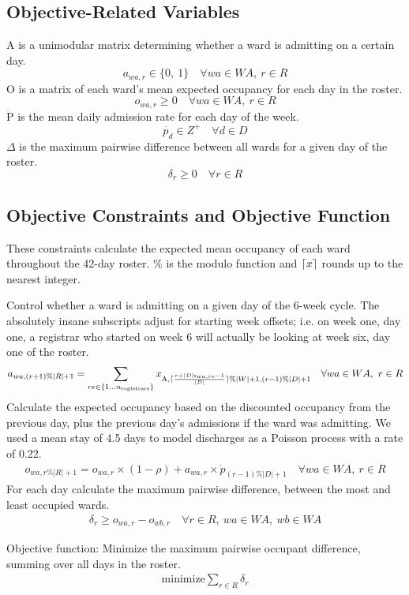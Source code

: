 \documentclass[a4paper]{article}
\DeclarePairedDelimiter{\ceil}{\lceil}{\rceil}
\begin{document}
\subsection{Objective-Related Variables}

A is a unimodular matrix determining whether a ward is admitting on a certain day.
$$a_{wa, r} \in \{0,\ 1\} \quad\forall wa\in WA,\ r\in R$$
O is a matrix of each ward's mean expected occupancy for each day in the roster.
$$o_{wa, r} \ge 0 \quad\forall wa\in WA,\ r\in R$$
$\dot{\text{P}}$ is the mean daily admission rate for each day of the week.
$$\dot{p_{d}} \in Z^+ \quad\forall d\in D$$
$\Delta$ is the maximum pairwise difference between all wards for a given day of the roster.
$$\delta_r \ge 0 \quad\forall r \in R$$

\subsection{Objective Constraints and Objective Function}

These constraints calculate the expected mean occupancy of each ward throughout the 42-day roster. $\%$ is the modulo function and $\ceil{x}$ rounds up to the nearest integer.

Control whether a ward is admitting on a given day of the 6-week cycle. The absolutely insane subscripts adjust for starting week offsets; i.e. on week one, day one, a registrar who started on week 6 will actually be looking at week six, day one of the roster.
\begin{align}
  a_{wa, (r+1)\%|R|+1} = \sum_{re\in \{1\dots n_\text{registrars}\}}{x_{\text{A}, \ceil{\frac{r+|D|\text{s}_{wa, re}-1}{|D|}} \% |W|+1, (r-1) \% |D|+1}} \quad\forall wa \in WA,\ r \in R
\end{align}
Calculate the expected occupancy based on the discounted occupancy from the previous day, plus the previous day's admissions if the ward was admitting. We used a mean stay of 4.5 days to model discharges as a Poisson process with a rate of 0.22.
\begin{align}
  o_{wa, r\%|R|+1} = o_{wa, r} \times (1-\rho) + a_{wa, r} \times \dot{p}_{(r-1)\%|D|+1} \quad\forall wa \in WA,\ r \in R
\end{align}
For each day calculate the maximum pairwise difference, between the most and least occupied wards.
\begin{align}
  \delta_r \ge o_{wa, r} - o_{wb, r} \quad\forall r \in R,\ wa \in WA,\ wb \in WA
\end{align}

\begin{framed}
Objective function: Minimize the maximum pairwise occupant difference, summing over all days in the roster.
\begin{align}
  \text{minimize} \sum_{r\in R}{\delta_r}
\end{align}
\end{framed}
\end{document}
